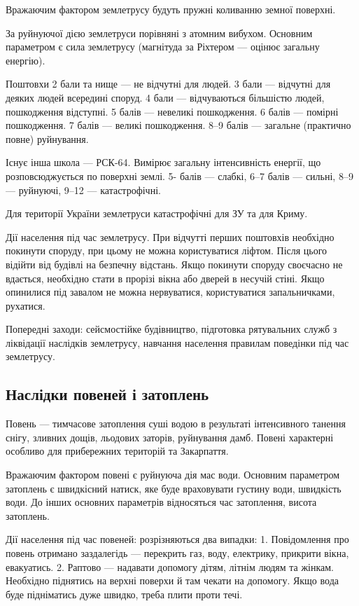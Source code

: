 \documentclass[a4paper,10pt,notitlepage,pdftex,headsepline]{scrartcl}
\begin{document}
    Вражаючим фактором землетрусу будуть пружні коливанню земної поверхні.

    За руйнуючої дією землетруси порівняні з атомним вибухом.
    Основним параметром є сила землетрусу (магнітуда за Ріхтером --- оцінює
    загальну енергію).

    Поштовхи 2 бали та нище --- не відчутні для людей. 3 бали ---
    відчутні для деяких людей всередині споруд. 4 бали --- відчуваються
    більшістю людей, пошкодження відступні. 5 балів --- невеликі пошкодження.
    6 балів --- помірні пошкодження. 7 балів --- великі пошкодження. 8--9 балів
    --- загальне (практично повне) руйнування.

    Існує інша школа --- РСК-64. Вимірює загальну інтенсивність енергії, що
    розповсюджується по поверхні землі.
    5- балів --- слабкі, 6--7 балів --- сильні, 8--9 --- руйнуючі, 9--12 ---
    катастрофічні.

    Для території України землетруси катастрофічні для ЗУ та для Криму.

    Дії населення під час землетрусу. При відчутті перших поштовхів необхідно
    покинути споруду, при цьому не можна користуватися ліфтом.
    Після цього відійти від будівлі на безпечну відстань.
    Якщо покинути споруду своєчасно не вдається, необхідно стати в прорізі
    вікна або дверей в несучій стіні.
    Якщо опинилися під завалом не можна нервуватися, користуватися
    запальничками, рухатися.

    Попередні заходи: сейсмостійке будівництво, підготовка рятувальних служб з
    ліквідації наслідків землетрусу, навчання населення правилам поведінки під
    час землетрусу.
  \subsection{Наслідки повеней і затоплень}
    Повень --- тимчасове затоплення суші водою в результаті інтенсивного
    танення снігу, зливних дощів, льодових заторів, руйнування дамб.
    Повені характерні особливо для прибережних територій та Закарпаття.

    Вражаючим фактором повені є руйнуюча дія мас води.
    Основним параметром затоплень є швидкісний натиск, яке буде враховувати
    густину води, швидкість води.
    До інших основних параметрів відносяться час затоплення, висота затоплень.

    Дії населення під час повеней: розрізняються два випадки:
      1. Повідомлення про повень отримано заздалегідь --- перекрить газ, воду,
      електрику, прикрити вікна, евакуатись.
      2. Раптово --- надавати допомогу дітям, літнім людям та жінкам.
      Необхідно піднятись на верхні поверхи й там чекати на допомогу.
      Якщо вода буде підніматись дуже швидко, треба плити проти течі.
\end{document}

